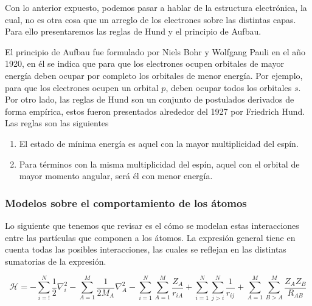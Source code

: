 Con lo anterior expuesto, podemos pasar a hablar de la estructura electrónica, la cual, no es otra cosa que un arreglo de los electrones sobre las distintas capas. Para ello presentaremos las reglas de Hund y el principio de Aufbau.

El principio de Aufbau fue formulado por Niels Bohr y Wolfgang Pauli en el año 1920, en él se indica que para que los electrones ocupen orbitales de mayor energía deben ocupar por completo los orbitales de menor energía. Por ejemplo, para que los electrones ocupen un orbital $p$, deben ocupar todos los orbitales $s$. Por otro lado, las reglas de Hund son un conjunto de postulados derivados de forma empírica, estos fueron presentados alrededor del 1927 por Friedrich Hund. Las reglas son las siguientes
\begin{enumerate}
    \item El estado de mínima energía es aquel con la mayor multiplicidad del espín.
    \item Para términos con la misma multiplicidad del espín, aquel con el orbital de mayor momento angular, será él con menor energía.
\end{enumerate}

\subsubsection{Modelos sobre el comportamiento de los átomos}
Lo siguiente que tenemos que revisar es el cómo se modelan estas interacciones entre las partículas que componen a los átomos. La expresión general\cite{szabo1996modern} tiene en cuenta todas las posibles interacciones, las cuales se reflejan en las distintas sumatorias de la expresión.

\begin{equation*}
    \mathcal{H} = -\sum_{i=!}^{N}\frac{1}{2}\nabla_i^2 - \sum_{A = 1}^{M} \frac{1}{2M_A}\nabla_A^{2} -\sum_{i=1}^{N}\sum_{A = 1}^{M} \frac{Z_A}{r_{iA}} + \sum_{i=1}^{N}\sum_{j>i}^{N} \frac{1}{r_{ij}}  + \sum_{A=1}^{M}\sum_{B>A}^{M} \frac{Z_AZ_B}{R_{AB}}
\end{equation*}

